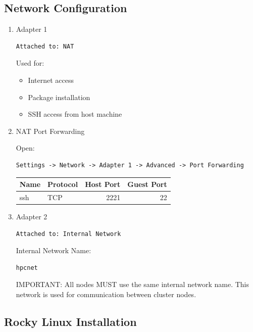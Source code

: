 \documentclass[11pt]{article}
\begin{document}
\subsection{Network Configuration}
\label{sec:org2c174fb}
\begin{enumerate}
\item Adapter 1
\label{sec:org879d9d0}

\begin{verbatim}
Attached to: NAT
\end{verbatim}
Used for:

\begin{itemize}
\item Internet access
\item Package installation
\item SSH access from host machine
\end{itemize}
\item NAT Port Forwarding
\label{sec:orgb259550}

Open:

\begin{verbatim}
Settings -> Network -> Adapter 1 -> Advanced -> Port Forwarding
\end{verbatim}

\begin{center}
\begin{tabular}{llrr}
Name & Protocol & Host Port & Guest Port\\
\hline
ssh & TCP & 2221 & 22\\
\end{tabular}
\end{center}
\item Adapter 2
\label{sec:org7969fa1}

\begin{verbatim}
Attached to: Internal Network
\end{verbatim}

Internal Network Name:

\begin{verbatim}
hpcnet
\end{verbatim}

IMPORTANT:
All nodes MUST use the same internal network name.
This network is used for communication between cluster nodes.
\end{enumerate}
\subsection{Rocky Linux Installation}
\label{sec:orgdaf223e}
\end{document}
